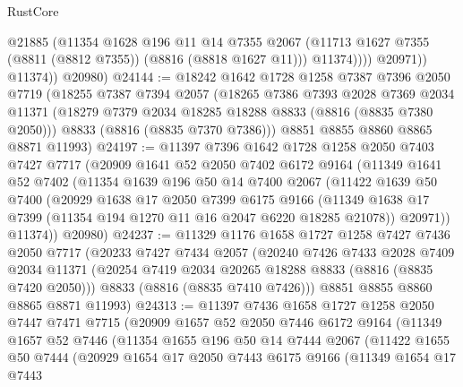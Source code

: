 \begin{lexlean}{RustCore}
\begin{coremodule}
                    @21885
                    (@11354
                      @1628
                      @196
                      @11
                      @14
                      @7355
                      @2067
                      (@11713 @1627 @7355 (@8811 (@8812 @7355)) (@8816 (@8818 @1627 @11)))
                      @11374))))
              @20971))
          @11374))
      @20980)
@24144 := @18242
    @1642
    @1728
    @1258
    @7387
    @7396
    @2050
    @7719
    (@18255
      @7387
      @7394
      @2057
      (@18265
        @7386
        @7393
        @2028
        @7369
        @2034
        @11371
        (@18279 @7379 @2034 @18285 @18288 @8833 (@8816 (@8835 @7380 @2050)))
        @8833
        (@8816 (@8835 @7370 @7386)))
      @8851
      @8855
      @8860
      @8865
      @8871
      @11993)
@24197 := @11397
    @7396
    @1642
    @1728
    @1258
    @2050
    @7403
    @7427
    @7717
    (@20909
      @1641
      @52
      @2050
      @7402
      @6172
      @9164
      (@11349
        @1641
        @52
        @7402
        (@11354
          @1639
          @196
          @50
          @14
          @7400
          @2067
          (@11422
            @1639
            @50
            @7400
            (@20929
              @1638
              @17
              @2050
              @7399
              @6175
              @9166
              (@11349 @1638 @17 @7399 (@11354 @194 @1270 @11 @16 @2047 @6220 @18285 @21078))
              @20971))
          @11374))
      @20980)
@24237 := @11329
    @1176
    @1658
    @1727
    @1258
    @7427
    @7436
    @2050
    @7717
    (@20233
      @7427
      @7434
      @2057
      (@20240
        @7426
        @7433
        @2028
        @7409
        @2034
        @11371
        (@20254 @7419 @2034 @20265 @18288 @8833 (@8816 (@8835 @7420 @2050)))
        @8833
        (@8816 (@8835 @7410 @7426)))
      @8851
      @8855
      @8860
      @8865
      @8871
      @11993)
@24313 := @11397
    @7436
    @1658
    @1727
    @1258
    @2050
    @7447
    @7471
    @7715
    (@20909
      @1657
      @52
      @2050
      @7446
      @6172
      @9164
      (@11349
        @1657
        @52
        @7446
        (@11354
          @1655
          @196
          @50
          @14
          @7444
          @2067
          (@11422
            @1655
            @50
            @7444
            (@20929
              @1654
              @17
              @2050
              @7443
              @6175
              @9166
              (@11349
                @1654
                @17
                @7443

\end{coremodule}
\end{lexlean}
